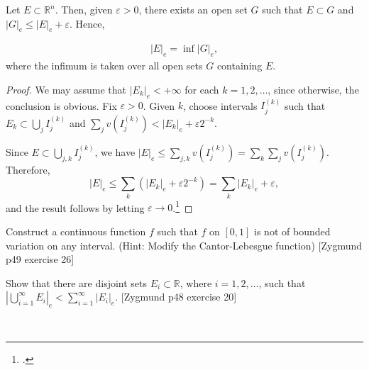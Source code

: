 \documentclass[UTF8,a4paper,10pt]{article}
\begin{document}
\begin{mybox}{}

  \setcounter{section}{3} 
  \setcounter{theorem}{5}
  
  \begin{theorem}\label{thm:3.6}
    Let $E \subset \mathbb{R}^n$. Then, given $\varepsilon > 0$, there exists an open set $G$ such that
    $E \subset G$ and $|G|_e \leq |E|_e + \varepsilon$. Hence,

    \begin{equation}
      \tag{3.7}
      \begin{aligned}
        |E|_e = \inf |G|_e,
      \end{aligned}
    \end{equation}
    where the infimum is taken over all open sets $G$ containing $E$.
    
    \end{theorem}
    
    \begin{proof}
    We may assume that $|E_k|_e < +\infty$ for each $k = 1, 2, \ldots$, since otherwise, the conclusion is obvious. Fix $\varepsilon > 0$. Given $k$, choose intervals $I^{(k)}_j$ such that $E_k \subset \bigcup_j I^{(k)}_j$ and $\sum_j v(I^{(k)}_j) < |E_k|_e + \varepsilon 2^{-k}$.
    
    Since $E \subset \bigcup_{j,k} I^{(k)}_j$, we have $|E|_e \leq \sum_{j,k} v(I^{(k)}_j) = \sum_k \sum_j v(I^{(k)}_j)$. Therefore,
    \[|E|_e \leq \sum_k (|E_k|_e + \varepsilon 2^{-k}) = \sum_k |E_k|_e + \varepsilon,\]
    and the result follows by letting $\varepsilon \to 0$.\footcite[][42]{Wheeden_Zygmund_2015}
    \end{proof}
     

\end{mybox}


\begin{Problem}[]{}
  Construct a continuous function $f$ such that $f$ on $[0, 1]$ is not of bounded variation on any interval. (Hint: Modify the Cantor-Lebesgue function) [Zygmund p49 exercise 26]

\end{Problem}

\begin{Problem}[]{}
  Show that there are disjoint sets $E_i \subset \mathbb{R}$, where $i = 1, 2, \ldots$, such that $\left|\bigcup_{i=1}^{\infty} E_i\right|_e < \sum_{i=1}^{\infty}|E_i|_e.$ [Zygmund p48 exercise 20]

\end{Problem}

  \begin{solution}\,



  \end{solution}
  \pagebreak
\end{document}
